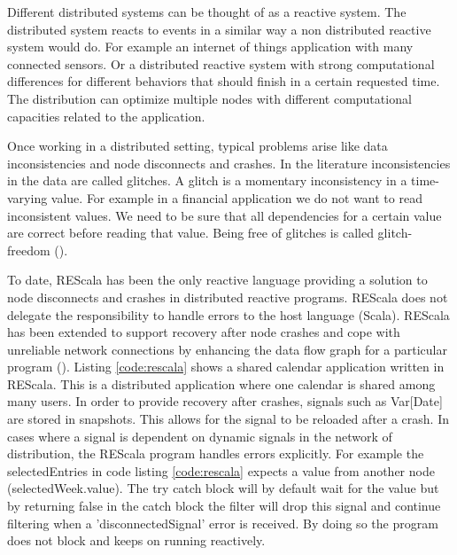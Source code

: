\documentclass[a4paper]{book}
\begin{document}
Different distributed systems can be thought of as a reactive system. The distributed system reacts to events in a similar way a non distributed reactive system would do. For example an internet of things application with many connected sensors. Or a distributed reactive system with strong computational differences for different behaviors that should finish in a certain requested time. The distribution can optimize multiple nodes with different computational capacities related to the application. 

Once working in a distributed setting, typical problems arise like data inconsistencies and node disconnects and crashes. In the literature inconsistencies in the data are called glitches. A glitch is a momentary inconsistency in a time-varying value. For example in a financial application we do not want to read inconsistent values. We need to be sure that all dependencies for a certain value are correct before reading that value. Being free of glitches is called glitch-freedom (\cite{DBLP:journals/tse/MargaraS18}). 

To date, REScala has been the only reactive language providing a solution to node disconnects and crashes in distributed reactive programs. REScala does not delegate the responsibility to handle errors to the host language (Scala). REScala has been extended to support recovery after node crashes and cope with unreliable network connections by enhancing the data flow graph for a particular program (\cite{DBLP:conf/ecoop/MogkBSFM18}). Listing \ref{code:rescala} shows a shared calendar application written in REScala. This is a distributed application where one calendar is shared among many users. In order to provide recovery after crashes, signals such as Var[Date] are stored in snapshots. This allows for the signal to be reloaded after a crash. In cases where a signal is dependent on dynamic signals in the network of distribution, the REScala program handles errors explicitly. For example the selectedEntries in code listing \ref{code:rescala} expects a value from another node (selectedWeek.value). The try catch block will by default wait for the value but by returning false in the catch block the filter will drop this signal and continue filtering when a 'disconnectedSignal' error is received. By doing so the program does not block and keeps on running reactively.  
\end{document}

